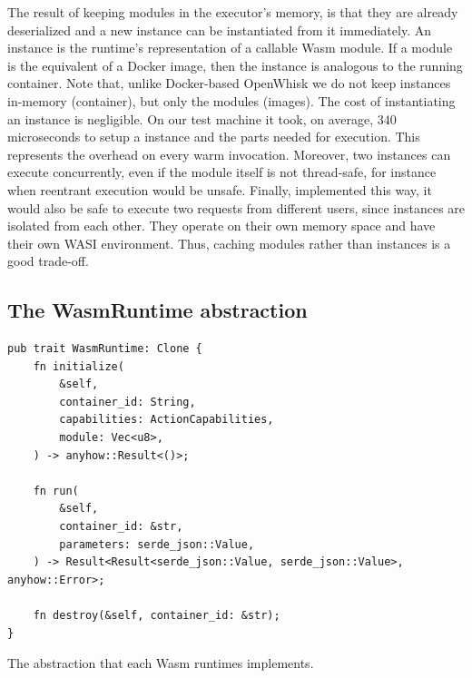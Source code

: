 The result of keeping modules in the executor's memory, is that they are already deserialized and a new instance can be instantiated from it immediately. An instance is the runtime's representation of a callable Wasm module. If a module is the equivalent of a Docker image, then the instance is analogous to the running container. Note that, unlike Docker-based OpenWhisk we do not keep instances in-memory (container), but only the modules (images). The cost of instantiating an instance is negligible. On our test machine it took, on average, 340 microseconds to setup a  instance and the parts needed for execution. This represents the overhead on every warm invocation. Moreover, two instances can execute concurrently, even if the module itself is not thread-safe, for instance when reentrant execution would be unsafe. Finally, implemented this way, it would also be safe to execute two requests from different users, since instances are isolated from each other. They operate on their own memory space and have their own WASI environment. Thus, caching modules rather than instances is a good trade-off.

\subsection{The WasmRuntime abstraction}



\begin{listing}[ht]
\begin{verbatim}
pub trait WasmRuntime: Clone {
    fn initialize(
        &self,
        container_id: String,
        capabilities: ActionCapabilities,
        module: Vec<u8>,
    ) -> anyhow::Result<()>;

    fn run(
        &self,
        container_id: &str,
        parameters: serde_json::Value,
    ) -> Result<Result<serde_json::Value, serde_json::Value>, anyhow::Error>;

    fn destroy(&self, container_id: &str);
}
\end{verbatim}
\caption{The  abstraction that each Wasm runtimes implements.}
\label{listing:wasm-executor-trait}
\end{listing}


